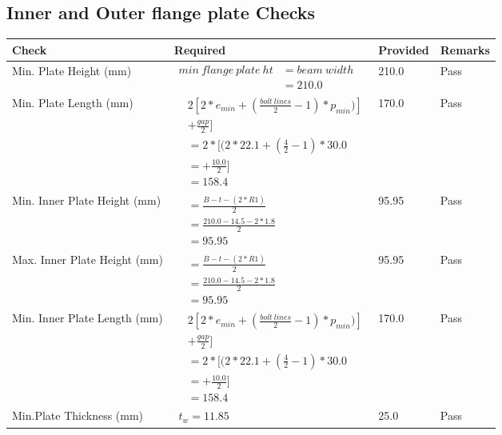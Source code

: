 \documentclass{article}%
\begin{document}
%
\newpage%
\subsection{Inner and Outer flange plate Checks}%
\label{subsec:InnerandOuterflangeplateChecks}%
\renewcommand{\arraystretch}{1.2}%
\begin{longtable}{|p{4cm}|p{6cm}|p{5.5cm}|p{1.5cm}|}%
\hline%
\rowcolor{OsdagGreen}%
Check&Required&Provided&Remarks\\%
\hline%
\endhead%
\hline%
Min. Plate Height (mm)&$\begin{aligned}min~flange~plate~ht &= beam~width\\ &=210.0\end{aligned}$&210.0&Pass\\%
\hline%
Min. Plate Length (mm)&$\begin{aligned} & 2[2*e_{min} + ({\frac{bolt~lines}{2}}-1) * p_{min})]\\ & +\frac{gap}{2}]\\ &=2*[(2*22.1 + (\frac{4}{2}-1) * 30.0\\ &= + \frac{10.0}{2}]\\ &=158.4\end{aligned}$&170.0&Pass\\%
\hline%
Min. Inner Plate Height (mm)&$\begin{aligned}&= \frac{B -t- (2*R1)}{2}\\ &=\frac{210.0 -14.5 - 2*1.8}{2}\\ &=95.95\end{aligned}$&95.95&Pass\\%
\hline%
Max. Inner Plate Height (mm)&$\begin{aligned}&= \frac{B -t- (2*R1)}{2}\\ &=\frac{210.0 -14.5 - 2*1.8}{2}\\ &=95.95\end{aligned}$&95.95&Pass\\%
\hline%
Min. Inner Plate Length (mm)&$\begin{aligned} & 2[2*e_{min} + ({\frac{bolt~lines}{2}}-1) * p_{min})]\\ & +\frac{gap}{2}]\\ &=2*[(2*22.1 + (\frac{4}{2}-1) * 30.0\\ &= + \frac{10.0}{2}]\\ &=158.4\end{aligned}$&170.0&Pass\\%
\hline%
Min.Plate Thickness (mm)&$\begin{aligned} t_w=11.85\end{aligned}$&25.0&Pass\\%
\hline%
\end{longtable}
\end{document}
